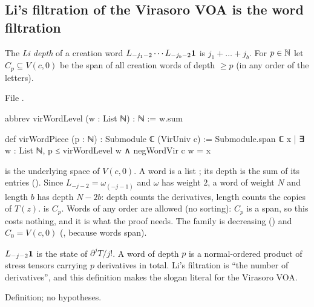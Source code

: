 \subsection{Li's filtration of the Virasoro VOA is the word filtration}

\begin{definition}\label{l20:def:virword}
The \emph{Li depth} of a creation word $L_{-j_1-2}\cdots L_{-j_b-2}\mathbf{1}$ is $j_1+\dots+j_b$. For $p\in{\mathbb{N}}$ let
$C_p\subseteq V(c,0)$ be the span of all creation words of depth $\ge p$ (in any order of the letters).
\end{definition}
\noindent File .
\begin{leancode}
abbrev virWordLevel (w : List ℕ) : ℕ := w.sum

def virWordPiece (p : ℕ) : Submodule ℂ (VirUniv c) :=
  Submodule.span ℂ {x | ∃ w : List ℕ, p ≤ virWordLevel w ∧ negWordVir c w = x}
\end{leancode}

\begin{dictionary}
 is the underlying space of $V(c,0)$. A word is a list ; its depth is the sum of its
entries (). Since $L_{-j-2}=\omega_{(-j-1)}$ and $\omega$ has weight $2$, a word of weight $N$ and length $b$
has depth $N-2b$: depth counts the derivatives, length counts the copies of $T(z)$.  is $C_p$.
Words of any order are allowed (no sorting): $C_p$ is a span, so this costs nothing, and it is what the proof needs.
The family is decreasing () and $C_0=V(c,0)$ (, because words
span).
\end{dictionary}

\begin{physics}
$L_{-j-2}\mathbf{1}$ is the state of $\partial^jT/j!$. A word of depth $p$ is a normal-ordered product of stress
tensors carrying $p$ derivatives in total. Li's filtration is ``the number of derivatives'', and this definition
makes the slogan literal for the Virasoro VOA.
\end{physics}

\begin{status}
Definition; no hypotheses.
\end{status}


